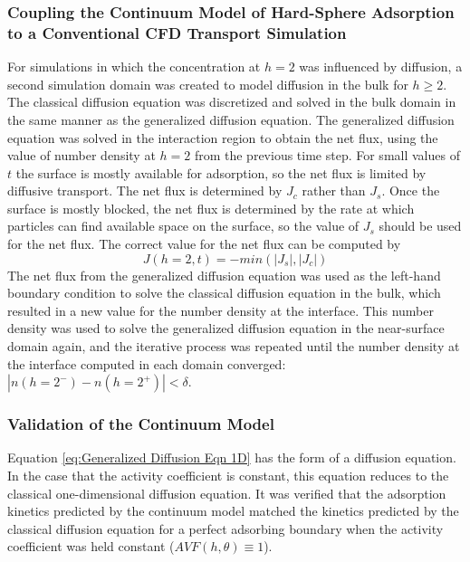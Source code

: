 \subsubsection{Coupling the Continuum Model of Hard-Sphere Adsorption to a Conventional
CFD Transport Simulation}

For simulations in which the concentration at $h=2$ was influenced
by diffusion, a second simulation domain was created to model diffusion
in the bulk for $h\geq2$. The classical diffusion equation was discretized
and solved in the bulk domain in the same manner as the generalized
diffusion equation. The generalized diffusion equation was solved
in the interaction region to obtain the net flux, using the value
of number density at $h=2$ from the previous time step. For small
values of $t$ the surface is mostly available for adsorption, so
the net flux is limited by diffusive transport. The net flux is determined
by $J_{c}$ rather than $J_{s}$. Once the surface is mostly blocked,
the net flux is determined by the rate at which particles can find
available space on the surface, so the value of $J_{s}$ should be
used for the net flux. The correct value for the net flux can be computed
by\begin{equation}
J\left(h=2,t\right)=-min\left(\left|J_{s}\right|,\left|J_{c}\right|\right)\label{eq:Net flux}\end{equation}
 The net flux from the generalized diffusion equation was used as
the left-hand boundary condition to solve the classical diffusion
equation in the bulk, which resulted in a new value for the number
density at the interface. This number density was used to solve the
generalized diffusion equation in the near-surface domain again, and
the iterative process was repeated until the number density at the
interface computed in each domain converged:$\left|n\left(h=2^{-}\right)-n\left(h=2^{+}\right)\right|<\delta$.


\subsubsection{Validation of the Continuum Model}

Equation \ref{eq:Generalized Diffusion Eqn 1D} has the form of a
diffusion equation. In the case that the activity coefficient is constant,
this equation reduces to the classical one-dimensional diffusion equation.
It was verified that the adsorption kinetics predicted by the continuum
model matched the kinetics predicted by the classical diffusion equation
for a perfect adsorbing boundary when the activity coefficient was
held constant ($AVF\left(h,\theta\right)\equiv1$). 


